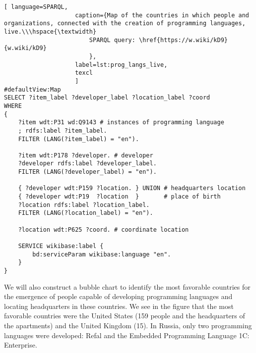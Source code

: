 \begin{lstlisting}[ language=SPARQL, 
                    caption={Map of the countries in which people and organizations, connected with the creation of programming languages, live.\\\hspace{\textwidth}
                        SPARQL query: \href{https://w.wiki/kD9}{w.wiki/kD9}
                        },
                    label=lst:prog_langs_live,
                    texcl 
                    ]
#defaultView:Map
SELECT ?item_label ?developer_label ?location_label ?coord
WHERE
{
    ?item wdt:P31 wd:Q9143 # instances of programming language
    ; rdfs:label ?item_label.     
    FILTER (LANG(?item_label) = "en"). 
  
    ?item wdt:P178 ?developer. # developer
    ?developer rdfs:label ?developer_label. 
    FILTER (LANG(?developer_label) = "en"). 
      		
    { ?developer wdt:P159 ?location. } UNION # headquarters location
    { ?developer wdt:P19  ?location  }       # place of birth
    ?location rdfs:label ?location_label. 
    FILTER (LANG(?location_label) = "en").
    
    ?location wdt:P625 ?coord. # coordinate location

    SERVICE wikibase:label {
        bd:serviceParam wikibase:language "en".
    }   	
}
\end{lstlisting}%

We will also construct a bubble chart to identify the most favorable countries for the emergence of people capable of developing programming languages and locating headquarters in these countries. We see in the figure that the most favorable countries were the United States (159 people and the headquarters of the apartments) and the United Kingdom (15). In Russia, only two programming languages were developed: Refal and the Embedded Programming Language 1C: Enterprise.

